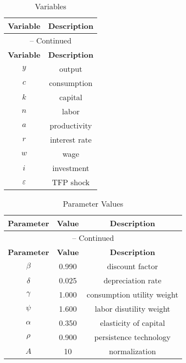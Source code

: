 \begin{minipage}{.3\linewidth}
\begin{center}
\begin{longtable}{cc}
\caption{Variables\label{tbl:RBC.Variables}}\\%
\toprule
\multicolumn{1}{c}{\textbf{Variable}} &
\multicolumn{1}{c}{\textbf{Description}}\\%
\midrule\midrule%
\endfirsthead%
\multicolumn{2}{c}{{\tablename} \thetable{} {--} Continued}\\%
\midrule%
\multicolumn{1}{c}{\textbf{Variable}} &
\multicolumn{1}{c}{\textbf{Description}}\\%
\midrule\midrule%
\endhead%
\({y}\) & output\\
\({c}\) & consumption\\
\({k}\) & capital\\
\({n}\) & labor\\
\({a}\) & productivity\\
\({r}\) & interest rate\\
\({w}\) & wage\\
\({i}\) & investment\\
\({\varepsilon}\) & TFP shock\\
\bottomrule%
\end{longtable}
\end{center}
\end{minipage}%
\begin{minipage}{.65\linewidth}
\begin{center}
\begin{longtable}{ccc}
\caption{Parameter Values\label{tbl:RBC.Parameters}}\\%
\toprule%
\multicolumn{1}{c}{\textbf{Parameter}} &
\multicolumn{1}{c}{\textbf{Value}} &
\multicolumn{1}{c}{\textbf{Description}}\\%
\midrule%
\endfirsthead%
\multicolumn{3}{c}{{\tablename} \thetable{} {--} Continued}\\%
\midrule%
\multicolumn{1}{c}{\textbf{Parameter}} &
\multicolumn{1}{c}{\textbf{Value}} &
\multicolumn{1}{c}{\textbf{Description}}\\%
\midrule%
\endhead%
\({\beta}\)  & 0.990 & discount factor\\
\({\delta}\) & 0.025 & depreciation rate\\
\({\gamma}\) & 1.000 & consumption utility weight\\
\({\psi}\)   & 1.600 & labor disutility weight\\
\({\alpha}\) & 0.350 & elasticity of capital\\
\({\rho}\) 	 & 0.900 & persistence technology\\
\(A\)        & 10    & normalization\\
\bottomrule%
\end{longtable}
\end{center}
\end{minipage}